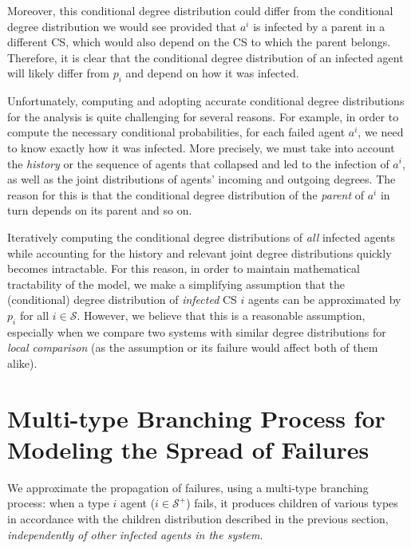 \documentclass[10pt, journal, compsoc]{IEEEtran}
\newcommand {\cS}{{\mathcal{S}}}
\begin{document}
Moreover, this conditional degree distribution could 
differ from the conditional degree distribution
we would see provided that $a^i$ is infected by a 
parent in a different CS, which would also depend
on the CS to which the parent belongs. 
Therefore, it is clear that 
the conditional degree distribution of an infected 
agent will likely differ from $p_i$ and depend on 
how it was infected. 

Unfortunately, computing and adopting accurate 
conditional degree distributions for the 
analysis is quite challenging for several 
reasons. For example, in order to compute the 
necessary conditional probabilities, 
for each failed agent $a^i$, 
we need to know exactly how it was 
infected. More precisely, 
we must take into account the {\em history} 
or the sequence
of agents that collapsed and led to the
infection of $a^i$, as well as the 
joint distributions of agents' incoming
and outgoing degrees.
The reason for this is that the 
conditional degree distribution 
of the {\em parent} of $a^i$ in turn depends on 
its parent and so on. 

Iteratively computing
the conditional degree distributions of
{\em all} infected agents while accounting for 
the history and relevant joint degree
distributions quickly becomes intractable.
For this reason, in order to maintain
mathematical tractability of the model, we make 
a simplifying assumption that the 
(conditional) degree
distribution of {\em infected} CS $i$
agents can be approximated by $p_i$ for
all $i \in \cS$. However, we believe that
this is a reasonable assumption, especially
when we compare two systems with similar 
degree distributions for {\em local comparison} 
(as the assumption or its failure would affect 
both of them alike). 




 

\section{Multi-type Branching Process for Modeling
	the Spread of Failures} 
	\label{sec:MTBP}
	
We approximate the propagation of failures, using 
a multi-type branching process: when a type $i$
agent ($i \in \cS^+$) fails, it produces 
children of various types in accordance with the
children distribution described in 
the previous section, {\em independently of other 
infected agents in the system}. 
\end{document}
